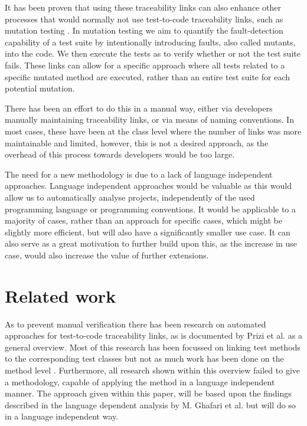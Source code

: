 \documentclass[11pt]{article}
\begin{document}
\begin{multicols}{2}
It has been proven that using these traceability links can also enhance other processes that would normally not use test-to-code traceability links, such as mutation testing \cite{10.1145/3278186.3278190}. In mutation testing we aim to quantify the fault-detection capability of a test suite by intentionally introducing faults, also called mutants, into the code. We then execute the tests as to verify whether or not the test suite fails. These links can allow for a specific approach where all tests related to a specific mutated method are executed, rather than an entire test suite for each potential mutation.

There has been an effort to do this in a manual way, either via developers manually maintaining traceability links, or via means of naming conventions. In most cases, these have been at the class level where the number of links was more maintainable and limited, however, this is not a desired approach, as the overhead of this process towards developers would be too large.

The need for a new methodology is due to a lack of language independent approaches. Language independent approaches would be valuable as this would allow us to automatically analyse projects, independently of the used programming language or programming conventions. It would be applicable to a majority of cases, rather than an approach for specific cases, which might be slightly more efficient, but will also have a significantly smaller use case. It can also serve as a great motivation to further build upon this, as the increase in use case, would also increase the value of further extensions.

\section{Related work}
As to prevent manual verification there has been research on automated approaches for test-to-code traceability links, as is documented by Prizi et al. \cite{6862933} as a general overview. Most of this research has been focussed on linking test methods to the corresponding test classes \cite{10.1007/978-3-030-24305-0_40, 8823709, 6080780, 8452876, qusef2014recovering, van2009establishing} but not as much work has been done on the method level \cite{10.1007/978-3-540-73101-6_14, 7335402, hurdugaci2012aiding, white2020establishing}. Furthermore, all research shown within this overview failed to give a methodology, capable of applying the method in a language independent manner. The approach given within this paper, will be based upon the findings described in the language dependent analysis by M. Ghafari et al. \cite{7335402} but will do so in a language independent way.


\end{multicols}
\end{document}
